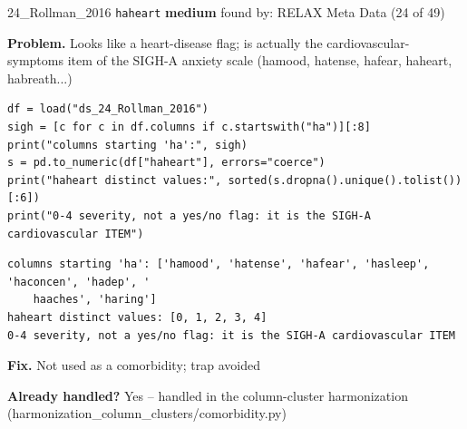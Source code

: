 \documentclass[9pt, t, handout]{beamer}
\newcommand{\ans}[1]{\textcolor{structure.fg}{#1}}
\begin{document}
\begin{frame}[fragile]{24\_Rollman\_2016 \quad \texttt{haheart}}
  {\scriptsize\textcolor{blue!55!black}{\textbf{medium}} \quad
   found by: RELAX Meta Data \quad (24 of 49)}
  \vspace{3pt}

  {\footnotesize \textbf{Problem.} Looks like a heart-disease flag; is actually the cardiovascular-symptoms item of the SIGH-A anxiety scale (hamood, hatense, hafear, haheart, habreath...)}
  \vspace{4pt}

  \begin{Verbatim}[fontsize=\tiny, frame=single, framesep=2pt, label=\tiny reproduce]
df = load("ds_24_Rollman_2016")
sigh = [c for c in df.columns if c.startswith("ha")][:8]
print("columns starting 'ha':", sigh)
s = pd.to_numeric(df["haheart"], errors="coerce")
print("haheart distinct values:", sorted(s.dropna().unique().tolist())[:6])
print("0-4 severity, not a yes/no flag: it is the SIGH-A cardiovascular ITEM")
  \end{Verbatim}
  \begin{Verbatim}[fontsize=\tiny, frame=single, framesep=2pt, label=\tiny output]
columns starting 'ha': ['hamood', 'hatense', 'hafear', 'hasleep', 'haconcen', 'hadep', '
    haaches', 'haring']
haheart distinct values: [0, 1, 2, 3, 4]
0-4 severity, not a yes/no flag: it is the SIGH-A cardiovascular ITEM
  \end{Verbatim}
  \vspace{2pt}

  {\footnotesize \textbf{Fix.} Not used as a comorbidity; trap avoided}
  \vspace{2pt}

  {\footnotesize \textbf{Already handled?} \ans{Yes} -- handled in the column-cluster harmonization
   (harmonization\_column\_clusters/comorbidity.py)}
\end{frame}
\end{document}
